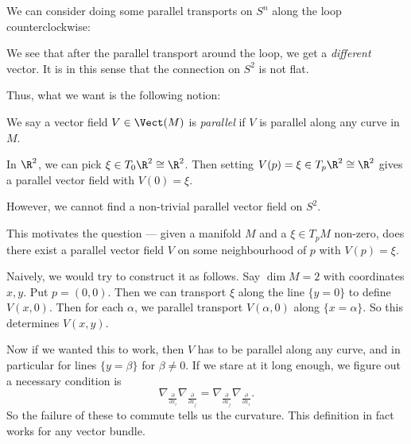 \documentclass[a4paper]{article}
\begin{document}
We can consider doing some parallel transports on $S^n$ along the loop counterclockwise:
\begin{center}
\end{center} %
We see that after the parallel transport around the loop, we get a \emph{different} vector. It is in this sense that the connection on $S^2$ is not flat.

Thus, what we want is the following notion:
\begin{defi}
  We say a vector field $V \in \Vect(M)$ is \emph{parallel} if $V$ is parallel along any curve in $M$.
\end{defi}

\begin{eg}
  In $\R^2$, we can pick $\xi \in T_0\R^2 \cong \R^2$. Then setting $V(p) = \xi \in T_p \R^2 \cong \R^2$ gives a parallel vector field with $V(0) = \xi$.
\end{eg}

However, we cannot find a non-trivial parallel vector field on $S^2$.

This motivates the question --- given a manifold $M$ and a $\xi \in T_p M$ non-zero, does there exist a parallel vector field $V$ on some neighbourhood of $p$ with $V(p) = \xi$.

Naively, we would try to construct it as follows. Say $\dim M = 2$ with coordinates $x, y$. Put $p = (0, 0)$. Then we can transport $\xi$ along the line $\{y = 0\}$ to define $V(x, 0)$. Then for each $\alpha$, we parallel transport $V(\alpha, 0)$ along $\{x = \alpha\}$. So this determines $V(x, y)$.

Now if we wanted this to work, then $V$ has to be parallel along any curve, and in particular for lines $\{y = \beta\}$ for $\beta \not= 0$. If we stare at it long enough, we figure out a necessary condition is
\[
  \nabla_{\frac{\partial}{\partial x_i}} \nabla_{\frac{\partial}{\partial x_j}} = \nabla_{\frac{\partial}{\partial x_j}} \nabla_{\frac{\partial}{\partial x_i}}.
\]
So the failure of these to commute tells us the curvature. This definition in fact works for any vector bundle.
\end{document}
